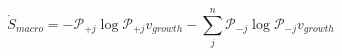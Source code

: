 \begin{equation}
\dot S_{macro} = -\mathcal P_{+j}\log\mathcal P_{+j}v_{growth} -\sum_j^n\mathcal P_{-j}\log\mathcal P_{-j} v_{growth}
\end{equation}